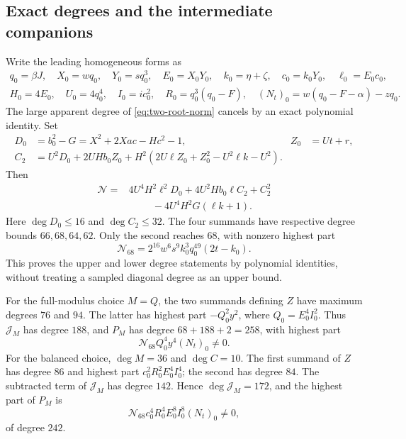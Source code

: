 \subsection{Exact degrees and the intermediate companions}

Write the leading homogeneous forms as
\begin{gather*}
 q_0=\beta J,\quad X_0=wq_0,\quad Y_0=sq_0^3,\quad E_0=X_0Y_0,\quad
 k_0=\eta+\zeta,\quad c_0=k_0Y_0,\quad \ell_0=E_0c_0,\\
 H_0=4E_0,\quad U_0=4q_0^4,\quad I_0=ic_0^2,\quad
 R_0=q_0^3(q_0-F),\quad (N_t)_0=w(q_0-F-\alpha)-zq_0.
\end{gather*}
The large apparent degree of \eqref{eq:two-root-norm} cancels by an exact
polynomial identity.  Set
\begin{align*}
 D_0&=b_0^2-G=X^2+2Xac-Hc^2-1,&Z_0&=Ut+r,\\
 C_2&=U^2D_0+2UHb_0Z_0
       +H^2(2U\ell Z_0+Z_0^2-U^2\ell k-U^2).
\end{align*}
Then
\begin{equation}
\begin{split}
 \mathcal N={}&4U^4H^2\ell^2D_0+4U^2Hb_0\ell C_2+C_2^2\\
 &\hspace{1cm}-4U^4H^2G(\ell k+1).
\end{split}
\label{eq:norm-degree-identity}
\end{equation}
Here $\deg D_0\le16$ and $\deg C_2\le32$.  The four summands have
respective degree bounds $66,68,64,62$.  Only the second reaches $68$,
with nonzero highest part
\begin{equation}
 \mathcal N_{68}=2^{16}w^6s^9k_0^3q_0^{49}(2t-k_0).
 \label{eq:low-norm-leader}
\end{equation}
This proves the upper and lower degree statements by polynomial identities,
without treating a sampled diagonal degree as an upper bound.

For the full-modulus choice $M=Q$, the two summands defining $Z$ have
maximum degrees $76$ and $94$.  The latter has highest part
$-Q_0^2y^2$, where $Q_0=E_0^4I_0^2$.  Thus $\mathcal J_M$ has degree
$188$, and $P_M$ has degree $68+188+2=258$, with highest part
\[
 \mathcal N_{68}Q_0^4y^4(N_t)_0\ne0.
\]
For the balanced choice, $\deg M=36$ and $\deg C=10$.  The first summand
of $Z$ has degree $86$ and highest part $c_0^2R_0^2E_0^4I_0^4$; the
second has degree $84$.  The subtracted term of $\mathcal J_M$ has degree
$142$.  Hence $\deg\mathcal J_M=172$, and the highest part of $P_M$ is
\[
 \mathcal N_{68}c_0^4R_0^4E_0^8I_0^8(N_t)_0\ne0,
\]
of degree $242$.

